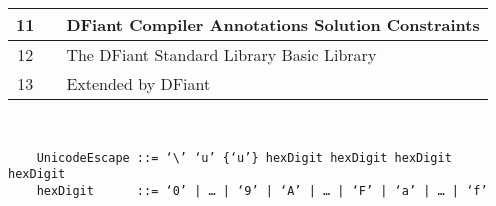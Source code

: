 \begin{tabular}{||c|c|p{8cm}||}
	\hline 
	11 & \chref{http://www.scala-lang.org/files/archive/spec/2.11/11-annotations.html}{Annotations} & 
	DFiant Compiler Annotations \newline
	Solution Constraints \\
	\hline 
	12 & \chref{http://www.scala-lang.org/files/archive/spec/2.11/12-the-scala-standard-library.html}{The Scala Standard Library} & The DFiant Standard Library \newline
	Basic Library \\
	\hline 
	13 & \chref{http://www.scala-lang.org/files/archive/spec/2.11/13-syntax-summary.html}{Syntax Summary} & Extended by DFiant \\
	\hline 
\end{tabular} \\



\begin{verbatim}
	UnicodeEscape ::= ‘\’ ‘u’ {‘u’} hexDigit hexDigit hexDigit hexDigit
	hexDigit      ::= ‘0’ | … | ‘9’ | ‘A’ | … | ‘F’ | ‘a’ | … | ‘f’
\end{verbatim}

